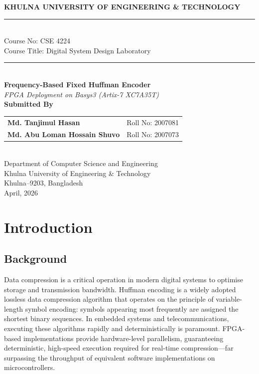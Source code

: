 \documentclass[12pt,a4paper]{article}
\begin{document}
\begin{titlepage}
  \centering
  \vspace*{1.5cm}
  {\LARGE \textbf{KHULNA UNIVERSITY OF ENGINEERING \& TECHNOLOGY}}\\[0.8cm]
  \rule{\linewidth}{0.5pt}\\[0.4cm]
  {\large Course No: CSE 4224}\\[0.2cm]
  {\large Course Title: Digital System Design Laboratory}\\[0.4cm]
  \rule{\linewidth}{0.5pt}\\[1.5cm]
  {\huge \textbf{Frequency-Based Fixed Huffman Encoder}}\\[0.4cm]
  {\Large \textit{FPGA Deployment on Basys3 (Artix-7 XC7A35T)}}\\[2cm]
  {\large \textbf{Submitted By}}\\[0.6cm]
  \begin{tabular}{ll}
    \textbf{Md. Tanjimul Hasan}           & Roll No: 2007081 \\[0.3cm]
    \textbf{Md. Abu Loman Hossain Shuvo}  & Roll No: 2007073 \\
  \end{tabular}\\[2cm]
  {\large Department of Computer Science and Engineering}\\[0.3cm]
  {\large Khulna University of Engineering \& Technology}\\[0.3cm]
  {\large Khulna--9203, Bangladesh}\\[1.5cm]
  {\large April, 2026}
\end{titlepage}

\tableofcontents
\newpage

\section{Introduction}

\subsection{Background}
Data compression is a critical operation in modern digital systems to optimise storage and
transmission bandwidth. Huffman encoding is a widely adopted lossless data compression
algorithm that operates on the principle of variable-length symbol encoding: symbols
appearing most frequently are assigned the shortest binary sequences. In embedded systems
and telecommunications, executing these algorithms rapidly and deterministically is
paramount. FPGA-based implementations provide hardware-level parallelism, guaranteeing
deterministic, high-speed execution required for real-time compression—far surpassing the
throughput of equivalent software implementations on microcontrollers.
\end{document}
